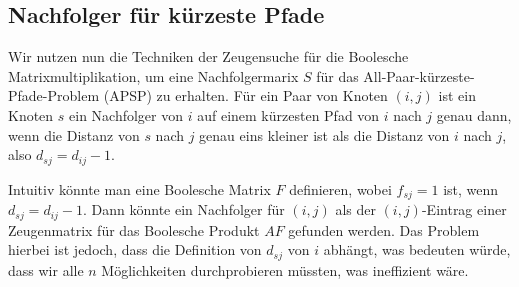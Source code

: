 \documentclass{scrartcl}
\numberwithin{equation}{section}
\begin{document}
\subsection{Nachfolger für kürzeste Pfade}

Wir nutzen nun die Techniken der Zeugensuche für die Boolesche Matrixmultiplikation, um eine Nachfolgermarix $S$ für das All-Paar-kürzeste-Pfade-Problem (APSP) zu erhalten. Für ein Paar von Knoten $(i, j)$ ist ein Knoten $s$ ein Nachfolger von $i$ auf einem kürzesten Pfad von $i$ nach $j$ genau dann, wenn die Distanz von $s$ nach $j$ genau eins kleiner ist als die Distanz von $i$ nach $j$, also $d_{sj} = d_{ij}-1$.

Intuitiv könnte man eine Boolesche Matrix $F$ definieren, wobei $f_{sj}=1$ ist, wenn $d_{sj}=d_{ij}-1$. Dann könnte ein Nachfolger für $(i, j)$ als der $(i, j)$-Eintrag einer Zeugenmatrix für das Boolesche Produkt $AF$ gefunden werden. Das Problem hierbei ist jedoch, dass die Definition von $d_{sj}$ von $i$ abhängt, was bedeuten würde, dass wir alle $n$ Möglichkeiten durchprobieren müssten, was ineffizient wäre.
\end{document}
